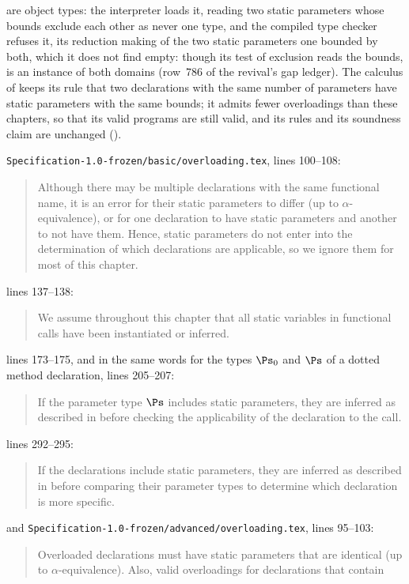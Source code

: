 \begin{description}
 are object types: the interpreter loads it, reading two static
parameters whose bounds exclude each other as never one type, and the compiled
type checker refuses it, its reduction making of the two static parameters one
bounded by both, which it does not find empty: though its test of exclusion reads
the bounds,  is an
instance of both domains (row~786 of the revival's gap ledger).
The calculus of  keeps its rule that two
declarations with the same number of parameters have static parameters with the
same bounds; it admits fewer overloadings than these chapters, so that its valid
programs are still valid, and its rules and its soundness claim are unchanged
().
\item[Original text] \nolinkurl{Specification-1.0-frozen/basic/overloading.tex},
lines 100--108:
\begin{quote}
Although there may be multiple declarations with the same functional name,
it is an error for their static parameters to differ (up to
$\alpha$-equivalence), or for one declaration to have static parameters and
another to not have them.
Hence, static parameters do not enter into the determination of which
declarations are applicable, so we ignore them for most of this chapter.
\end{quote}
lines 137--138:
\begin{quote}
We assume throughout this chapter that all static variables in functional calls
have been instantiated or inferred.
\end{quote}
lines 173--175, and in the same words for the types $\Ps_0$ and $\Ps$ of a
dotted method declaration, lines 205--207:
\begin{quote}
If the parameter type $\Ps$ includes static parameters, they are inferred as
described in  before checking the applicability of the
declaration to the call.
\end{quote}
lines 292--295:
\begin{quote}
If the declarations include static parameters, they are inferred as described
in  before comparing their parameter types to determine
which declaration is more specific.
\end{quote}
and \nolinkurl{Specification-1.0-frozen/advanced/overloading.tex}, lines
95--103:
\begin{quote}
Overloaded declarations must have static parameters that are identical (up to
$\alpha$-equivalence).  Also, valid overloadings for declarations that contain

\end{quote}
\end{description}
